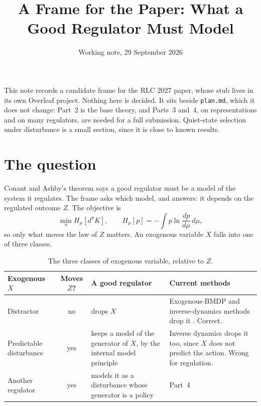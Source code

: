 \documentclass[10pt]{article}
\title{A Frame for the Paper: What a Good Regulator Must Model}
\author{Working note, 29 September 2026}
\date{}
\newcommand{\Hmu}{H_\mu}
\newcommand{\dpi}{d^\pi}
\begin{document}
\maketitle
\thispagestyle{fancy}

\noindent
This note records a candidate frame for the RLC 2027 paper, whose stub lives in its own Overleaf project. Nothing here is decided. It sits beside \texttt{plan.md}, which it does not change: Part~2 is the base theory, and Parts~3 and~4, on representations and on many regulators, are needed for a full submission. Quiet-state selection under disturbance is a small section, since it is close to known results.

\section{The question}

Conant and Ashby's theorem says a good regulator must be a model of the system it regulates. The frame asks which model, and answers: it depends on the regulated outcome $Z$. The objective is
\begin{equation}
  \min_\pi \Hmu[\dpi K], \qquad \Hmu[p] = -\int p \ln \frac{dp}{d\mu}\, d\mu ,
  \label{eq:obj}
\end{equation}
so only what moves the law of $Z$ matters. An exogenous variable $X$ falls into one of three classes.

\begin{table}[h]
\centering
\small
\begin{tabularx}{\textwidth}{@{}lcXX@{}}
\toprule
Exogenous $X$ & Moves $Z$? & A good regulator & Current methods \\
\midrule
Distractor & no & drops $X$ & Exogenous-BMDP and inverse-dynamics methods drop it \citep{Efroni-provable22,Islam-agentcontroller22,Dietterich-discovering18}. Correct. \\
Predictable disturbance & yes & keeps a model of the generator of $X$, by the internal model principle \citep{Francis-internal76,Sontag-adaptation03} & Inverse dynamics drops it too, since $X$ does not predict the action. Wrong for regulation. \\
Another regulator & yes & models it as a disturbance whose generator is a policy & Part~4 \\
\bottomrule
\end{tabularx}
\caption{The three classes of exogenous variable, relative to $Z$.}
\label{tab:classes}
\end{table}
\end{document}
